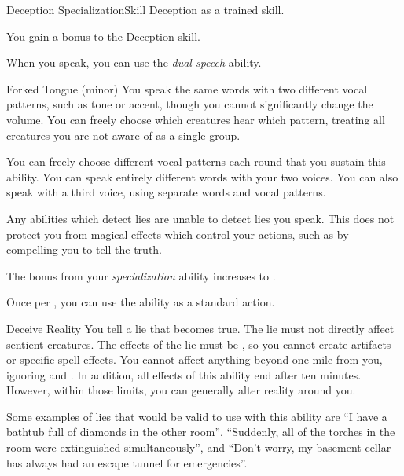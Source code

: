     \begin{feat}{Deception Specialization}{Skill}
        \featpre Deception as a trained skill.

         You gain a  bonus to the Deception skill.

         When you speak, you can use the \textit{dual speech} ability.
        \begin{sustainability}{Forked Tongue}{ (minor)}
            \rankline
            You speak the same words with two different vocal patterns, such as tone or accent, though you cannot significantly change the volume.
            You can freely choose which creatures hear which pattern, treating all creatures you are not aware of as a single group. 

            You can freely choose different vocal patterns each round that you sustain this ability.
            \rankline
             You can speak entirely different words with your two voices.
             You can also speak with a third voice, using separate words and vocal patterns.
        \end{sustainability}

         Any \magical abilities which detect lies are unable to detect lies you speak.
        This does not protect you from magical effects which control your actions, such as by compelling you to tell the truth.

         The bonus from your \textit{specialization} ability increases to .

         Once per , you can use the  ability as a standard action.
        \begin{magicalactiveability}{Deceive Reality}
            \rankline
            You tell a lie that becomes true.
            The lie must not directly affect sentient creatures.
            The effects of the lie must be , so you cannot create artifacts or specific spell effects.
            You cannot affect anything beyond one mile from you, ignoring  and .
            In addition, all effects of this ability end after ten minutes.
            However, within those limits, you can generally alter reality around you.

            Some examples of lies that would be valid to use with this ability are ``I have a bathtub full of diamonds in the other room'', ``Suddenly, all of the torches in the room were extinguished simultaneously'', and ``Don't worry, my basement cellar has always had an escape tunnel for emergencies''.
        \end{magicalactiveability}
    \end{feat}

